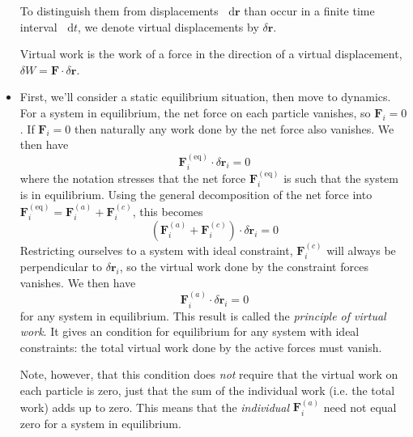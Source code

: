 \documentclass[11pt, a4paper]{article}
\newcommand{\diff}{\mathop{}\!\mathrm{d}} %
\begin{document}
\begin{itemize}
	To distinguish them from displacements $ \diff \bm{r} $ than occur in a finite time interval $ \diff t $, we denote virtual displacements by $ \delta \bm{r} $.
	
	Virtual work is the work of a force in the direction of a virtual displacement, $ \delta W = \bm{F} \cdot \delta \bm{r}
	 $.
	
	
	\item First, we'll consider a static equilibrium situation, then move to dynamics. For a system in equilibrium, the net force on each particle vanishes, so $ \bm{F}_{i} = 0 $. If $ \bm{F}_{i} = 0  $ then naturally any work done by the net force also vanishes. We then have
	\begin{equation*}
		\bm{F}_{i}^{(\text{eq})} \cdot \delta \bm{r}_{i} = 0
	\end{equation*}
	where the notation stresses that the net force $ \bm{F}_{i}^{(\text{eq})} $ is such that the system is in equilibrium. Using the general decomposition of the net force into $ \bm{F}_{i}^{(\text{eq})} = \bm{F}_{i}^{(a)} + \bm{F}_{i}^{(c)} $, this becomes
	\begin{equation*}
		 \left (\bm{F}_{i}^{(a)} + \bm{F}_{i}^{(c)}\right ) \cdot \delta \bm{r}_{i} = 0
	\end{equation*}
	Restricting ourselves to a system with ideal constraint, $ \bm{F}_{i}^{(c)} $ will always be perpendicular to $ \delta \bm{r}_{i} $, so the virtual work done by the constraint forces vanishes. We then have
	\begin{equation*}
		\bm{F}_{i}^{(a)} \cdot \delta \bm{r}_{i} = 0
	\end{equation*}
	for any system in equilibrium. This result is called the \textit{principle of virtual work}. It gives an condition for equilibrium for any system with ideal constraints: the total virtual work done by the active forces must vanish. 
	
	Note, however, that this condition does \textit{not} require that the virtual work on each particle is zero, just that the sum of the individual work (i.e. the total work) adds up to zero. This means that the \textit{individual} $ \bm{F}_{i}^{(a)} $ need not equal zero for a system in equilibrium. 
	
	

\end{itemize}
\end{document}
